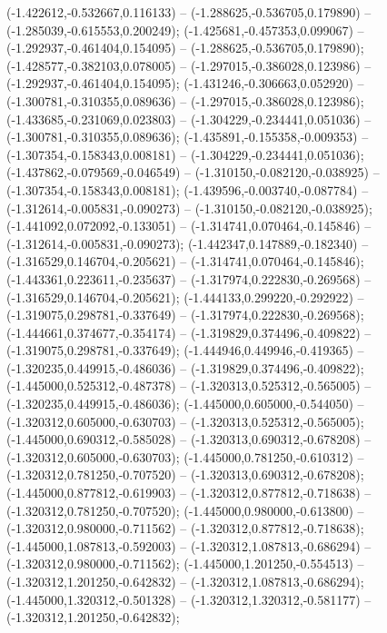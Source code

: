  (-1.422612,-0.532667,0.116133) -- (-1.288625,-0.536705,0.179890) -- (-1.285039,-0.615553,0.200249);
 (-1.425681,-0.457353,0.099067) -- (-1.292937,-0.461404,0.154095) -- (-1.288625,-0.536705,0.179890);
 (-1.428577,-0.382103,0.078005) -- (-1.297015,-0.386028,0.123986) -- (-1.292937,-0.461404,0.154095);
 (-1.431246,-0.306663,0.052920) -- (-1.300781,-0.310355,0.089636) -- (-1.297015,-0.386028,0.123986);
 (-1.433685,-0.231069,0.023803) -- (-1.304229,-0.234441,0.051036) -- (-1.300781,-0.310355,0.089636);
 (-1.435891,-0.155358,-0.009353) -- (-1.307354,-0.158343,0.008181) -- (-1.304229,-0.234441,0.051036);
 (-1.437862,-0.079569,-0.046549) -- (-1.310150,-0.082120,-0.038925) -- (-1.307354,-0.158343,0.008181);
 (-1.439596,-0.003740,-0.087784) -- (-1.312614,-0.005831,-0.090273) -- (-1.310150,-0.082120,-0.038925);
 (-1.441092,0.072092,-0.133051) -- (-1.314741,0.070464,-0.145846) -- (-1.312614,-0.005831,-0.090273);
 (-1.442347,0.147889,-0.182340) -- (-1.316529,0.146704,-0.205621) -- (-1.314741,0.070464,-0.145846);
 (-1.443361,0.223611,-0.235637) -- (-1.317974,0.222830,-0.269568) -- (-1.316529,0.146704,-0.205621);
 (-1.444133,0.299220,-0.292922) -- (-1.319075,0.298781,-0.337649) -- (-1.317974,0.222830,-0.269568);
 (-1.444661,0.374677,-0.354174) -- (-1.319829,0.374496,-0.409822) -- (-1.319075,0.298781,-0.337649);
 (-1.444946,0.449946,-0.419365) -- (-1.320235,0.449915,-0.486036) -- (-1.319829,0.374496,-0.409822);
 (-1.445000,0.525312,-0.487378) -- (-1.320313,0.525312,-0.565005) -- (-1.320235,0.449915,-0.486036);
 (-1.445000,0.605000,-0.544050) -- (-1.320312,0.605000,-0.630703) -- (-1.320313,0.525312,-0.565005);
 (-1.445000,0.690312,-0.585028) -- (-1.320313,0.690312,-0.678208) -- (-1.320312,0.605000,-0.630703);
 (-1.445000,0.781250,-0.610312) -- (-1.320312,0.781250,-0.707520) -- (-1.320313,0.690312,-0.678208);
 (-1.445000,0.877812,-0.619903) -- (-1.320312,0.877812,-0.718638) -- (-1.320312,0.781250,-0.707520);
 (-1.445000,0.980000,-0.613800) -- (-1.320312,0.980000,-0.711562) -- (-1.320312,0.877812,-0.718638);
 (-1.445000,1.087813,-0.592003) -- (-1.320312,1.087813,-0.686294) -- (-1.320312,0.980000,-0.711562);
 (-1.445000,1.201250,-0.554513) -- (-1.320312,1.201250,-0.642832) -- (-1.320312,1.087813,-0.686294);
 (-1.445000,1.320312,-0.501328) -- (-1.320312,1.320312,-0.581177) -- (-1.320312,1.201250,-0.642832);
